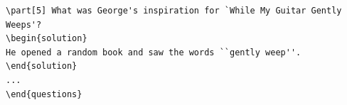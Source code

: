 \begin{frame}[fragile]
\begin{columns}[T]
\begin{column}{.49\textwidth}
\begin{beamerboxesrounded}{}
\begin{lstlisting}[moretexcs={question,choice,CorrectChoice,part,printanswers},
emph={exam,questions,oneparchoices,parts,solution},
basicstyle=\ttfamily\scriptsize\lsstyle,lineskip=-1pt,escapechar=;]
\part[5] What was George's inspiration for `While My Guitar Gently Weeps'?
\begin{solution}
He opened a random book and saw the words ``gently weep''.
\end{solution} 
...
\end{questions}
\end{lstlisting}
\vspace{-1em}
\end{beamerboxesrounded}
\end{column}
\begin{column}{.49\textwidth}
\centering
{}%

\end{column}
\end{columns}
\end{frame}
